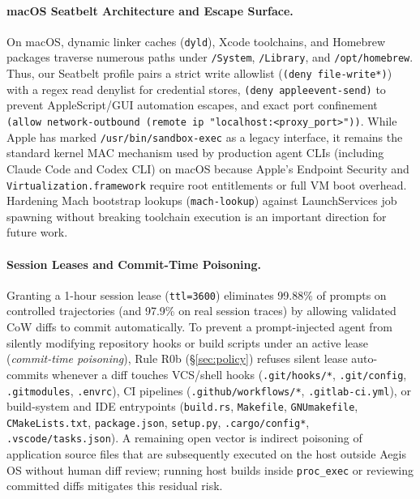 \documentclass[10pt,twocolumn]{article}
\begin{document}
\paragraph{macOS Seatbelt Architecture and Escape Surface.} On macOS, dynamic linker caches (\texttt{dyld}), Xcode toolchains, and Homebrew packages traverse numerous paths under \texttt{/System}, \texttt{/Library}, and \texttt{/opt/homebrew}. Thus, our Seatbelt profile pairs a strict write allowlist (\texttt{(deny file-write*)}) with a regex read denylist for credential stores, \texttt{(deny appleevent-send)} to prevent AppleScript/GUI automation escapes, and exact port confinement \texttt{(allow network-outbound (remote ip "localhost:<proxy\_port>"))}. While Apple has marked \texttt{/usr/bin/sandbox-exec} as a legacy interface, it remains the standard kernel MAC mechanism used by production agent CLIs (including Claude Code and Codex CLI) on macOS because Apple's Endpoint Security and \texttt{Virtualization.framework} require root entitlements or full VM boot overhead. Hardening Mach bootstrap lookups (\texttt{mach-lookup}) against LaunchServices job spawning without breaking toolchain execution is an important direction for future work.

\paragraph{Session Leases and Commit-Time Poisoning.} Granting a 1-hour session lease (\texttt{ttl=3600}) eliminates 99.88\% of prompts on controlled trajectories (and 97.9\% on real session traces) by allowing validated CoW diffs to commit automatically. To prevent a prompt-injected agent from silently modifying repository hooks or build scripts under an active lease (\emph{commit-time poisoning}), Rule R0b (\S\ref{sec:policy}) refuses silent lease auto-commits whenever a diff touches VCS/shell hooks (\texttt{.git/hooks/*}, \texttt{.git/config}, \texttt{.gitmodules}, \texttt{.envrc}), CI pipelines (\texttt{.github/workflows/*}, \texttt{.gitlab-ci.yml}), or build-system and IDE entrypoints (\texttt{build.rs}, \texttt{Makefile}, \texttt{GNUmakefile}, \texttt{CMakeLists.txt}, \texttt{package.json}, \texttt{setup.py}, \texttt{.cargo/config*}, \texttt{.vscode/tasks.json}). A remaining open vector is indirect poisoning of application source files that are subsequently executed on the host outside Aegis OS without human diff review; running host builds inside \texttt{proc\_exec} or reviewing committed diffs mitigates this residual risk.
\end{document}
